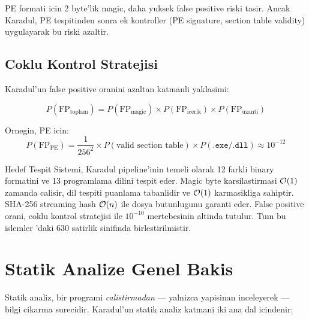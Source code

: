 PE formati icin 2 byte'lik magic, daha yuksek false positive riski tasir. Ancak Karadul, PE tespitinden sonra ek kontroller (PE signature, section table validity) uygulayarak bu riski azaltir.

\subsection{Coklu Kontrol Stratejisi}

Karadul'un false positive oranini azaltan katmanli yaklasimi:

\begin{equation}
\label{eq:multi-check-fp}
P(\text{FP}_{\text{toplam}}) = P(\text{FP}_{\text{magic}}) \times P(\text{FP}_{\text{icerik}}) \times P(\text{FP}_{\text{uzanti}})
\end{equation}

Ornegin, PE icin:
\begin{equation}
P(\text{FP}_{\text{PE}}) = \frac{1}{256^2} \times P(\text{valid section table}) \times P(\texttt{.exe}/\texttt{.dll}) \approx 10^{-12}
\end{equation}


\begin{ozet}
Hedef Tespit Sistemi, Karadul pipeline'inin temeli olarak 12 farkli binary formatini ve 13 programlama dilini tespit eder. Magic byte karsilastirmasi $\mathcal{O}\!\left(1\right)$ zamanda calisir, dil tespiti puanlama tabanlidir ve $\mathcal{O}\!\left(1\right)$ karmasikliga sahiptir. SHA-256 streaming hash $\mathcal{O}\!\left(n\right)$ ile dosya butunlugunu garanti eder. False positive orani, coklu kontrol stratejisi ile $10^{-10}$ mertebesinin altinda tutulur. Tum bu islemler 'daki 630 satirlik  sinifinda birlestirilmistir.
\end{ozet}



\newpage

\section{Statik Analize Genel Bakis}
\label{sec:static-overview}

Statik analiz, bir programi \emph{calistirmadan} --- yalnizca yapisinan inceleyerek --- bilgi cikarma surecidir. Karadul'un statik analiz katmani iki ana dal icindenir:

